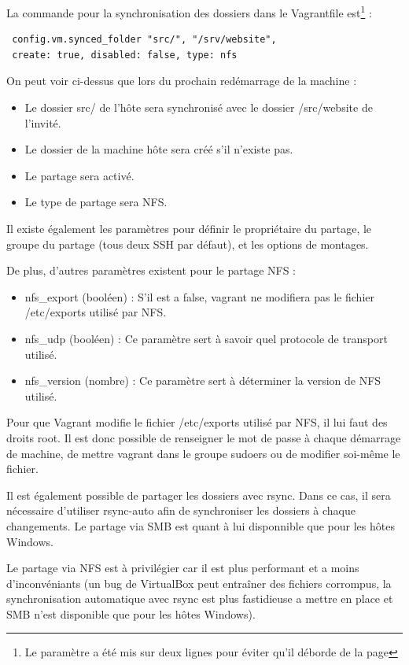 \documentclass[12pt,a4paper]{article}
\begin{document}
La commande pour la synchronisation des dossiers dans le Vagrantfile est\footnote{Le paramètre a été mis sur deux lignes pour éviter qu'il déborde de la page} :
\begin{lstlisting}
 config.vm.synced_folder "src/", "/srv/website", 
 create: true, disabled: false, type: nfs
\end{lstlisting}
On peut voir ci-dessus que lors du prochain redémarrage de la machine :
\begin{itemize}
	\item{Le dossier src/ de l'hôte sera synchronisé avec le dossier /src/website de l'invité.}
	\item{Le dossier de la machine hôte sera créé s'il n'existe pas.}
	\item{Le partage sera activé.}
	\item{Le type de partage sera NFS.}
\end{itemize}
Il existe également les paramètres pour définir le propriétaire du partage, le groupe du partage (tous deux SSH par défaut), et les options de montages.

De plus, d'autres paramètres existent pour le partage NFS : 
\begin{itemize}
	\item{nfs\_export (booléen) : S'il est a false, vagrant ne modifiera pas le fichier /etc/exports utilisé par NFS.}
	\item{nfs\_udp (booléen) : Ce paramètre sert à savoir quel protocole de transport utilisé.}
	\item{nfs\_version (nombre) : Ce paramètre sert à déterminer la version de NFS utilisé.}
\end{itemize}
Pour que Vagrant modifie le fichier /etc/exports utilisé par NFS, il lui faut des droits root. Il est donc possible de renseigner le mot de passe à chaque démarrage de machine, de mettre vagrant dans le groupe sudoers ou de modifier soi-même le fichier.

Il est également possible de partager les dossiers avec rsync. Dans ce cas, il sera nécessaire d'utiliser rsync-auto afin de synchroniser les dossiers à chaque changements. Le partage via SMB est quant à lui disponnible que pour les hôtes Windows. 

Le partage via NFS est à privilégier car il est plus performant et a moins d'inconvéniants (un bug de VirtualBox peut entraîner des fichiers corrompus, la synchronisation automatique avec rsync est plus fastidieuse a mettre en place et SMB n'est disponible que pour les hôtes Windows).
\end{document}
